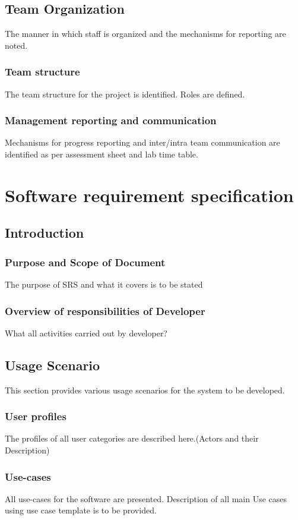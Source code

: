 \documentclass[oneside,a4paper,12pt]{report}
\begin{document}
\section{Team Organization}
The manner in which staff is organized and the mechanisms for reporting are noted.
\subsection{Team structure}
The team structure for the project is identified. Roles are defined.

\subsection{Management reporting and communication}
Mechanisms for progress reporting and inter/intra team communication are identified as per assessment sheet and lab time table.

\chapter{Software requirement specification  }

\section{Introduction}
\subsection{Purpose and Scope of Document}
The purpose of SRS and what it covers is to be stated

\subsection{Overview of responsibilities of Developer}
What all activities carried out by developer?

\section{Usage Scenario}
This section provides various usage scenarios for the system to be developed.
 \subsection{User profiles}
The profiles of all user categories are described here.(Actors and their Description)

\subsection{Use-cases}
All use-cases for the software are presented. Description of all main Use cases using use case template is to be provided.
\end{document}
